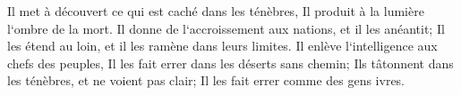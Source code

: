 \verse Il met à découvert ce qui est caché dans les ténèbres, Il produit à la lumière l`ombre de la mort. 
\verse Il donne de l`accroissement aux nations, et il les anéantit; Il les étend au loin, et il les ramène dans leurs limites. 
\verse Il enlève l`intelligence aux chefs des peuples, Il les fait errer dans les déserts sans chemin; 
\verse Ils tâtonnent dans les ténèbres, et ne voient pas clair; Il les fait errer comme des gens ivres. 

\chapter{}


